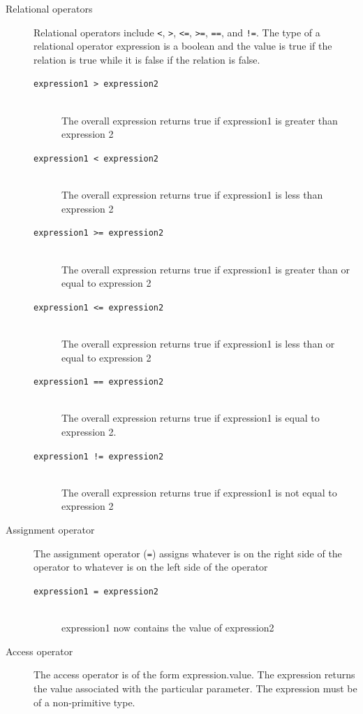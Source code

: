 \documentclass[11pt]{report}
\begin{document}
\begin{description}
\item[Relational operators]
Relational operators include \texttt{<}, \texttt{>}, \texttt{<=}, \texttt{>=}, \texttt{==}, and \texttt{!=}. The type of a relational operator expression is a boolean and the value is true if the relation is true while it is false if the relation is false.
	\begin{description}
		\item[\texttt{expression1 > expression2}] \hfill \\ The overall expression returns true if expression1 is greater than expression 2
		\item[\texttt{expression1 < expression2}] \hfill \\ The overall expression returns true if expression1 is less than expression 2
		\item[\texttt{expression1 >= expression2}] \hfill \\ The overall expression returns true if expression1 is greater than or equal to expression 2
		\item[\texttt{expression1 <= expression2}] \hfill \\ The overall expression returns true if expression1 is less than or equal to expression 2
		\item[\texttt{expression1 == expression2}] \hfill \\ The overall expression returns true if expression1 is equal to expression 2. 
		\item[\texttt{expression1 != expression2}] \hfill \\ The overall expression returns true if expression1 is not equal to expression 2
	\end{description}

\item[Assignment operator]
The assignment operator (\texttt{=}) assigns whatever is on the right side of the operator to whatever is on the left side of the operator
	\begin{description}
		\item[\texttt{expression1 = expression2}] \hfill \\ expression1 now contains the value of expression2
	\end{description}

\item[Access operator]
 The access operator is of the form expression.value. The expression returns the value associated with the particular parameter. The expression must be of a non-primitive type. 


\end{description}
\end{document}
